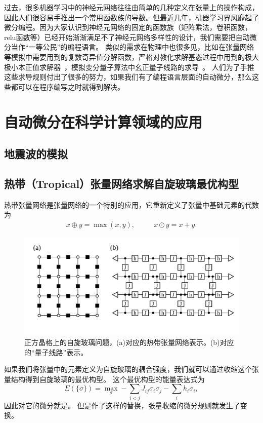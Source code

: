 \documentclass[A4,twoside,fontset=ubuntu,UTF8]{ctexart}
\begin{document}
过去，很多机器学习中的神经元网络往往由简单的几种定义在张量上的操作构成，因此人们很容易手推出一个常用函数族的导数。但最近几年，机器学习界风靡起了微分编程。因为大家认识到神经元网络的固定的函数族（矩阵乘法，卷积函数，relu函数等）已经开始渐渐满足不了神经元网络多样性的设计，我们需要把自动微分当作“一等公民”的编程语言。
类似的需求在物理中也很多见，比如在张量网络等模拟中需要用到的复数奇异值分解函数\cite{Wan2019,Liao2019}，严格对教化求解基态过程中用到的极大极小本正值求解器~\cite{Xie2020}，模拟变分量子算法中幺正量子线路的求导~\cite{Luo2019}。
人们为了手推这些求导规则付出了很多的努力，如果我们有了编程语言层面的自动微分，那么这些都可以在程序编写之时就得到解决。

\baselineskip
\section{自动微分在科学计算领域的应用}

\baselineskip
\subsection{地震波的模拟}

\baselineskip
\subsection{热带（Tropical）张量网络求解自旋玻璃最优构型}
热带张量网络是张量网络的一个特别的应用，它重新定义了张量中基础元素的代数为
\begin{eqnarray}
x \oplus y  = \max(x, y),\,\,\,\,\,\,\,\,\,\,\,\, \,\,\,\,
x \odot y   =  x + y. \label{eq:max-sum-alg}
\end{eqnarray}
\begin{figure}[t]
\centering
\includegraphics[width=\columnwidth]{./transform12.pdf}
    \caption{正方晶格上的自旋玻璃问题，(a)对应的热带张量网络表示。(b)对应的“量子线路”表示。\label{fig:performance}} 
\end{figure}
如果我们将张量中的元素定义为自旋玻璃的耦合强度，我们就可以通过收缩这个张量结构得到自旋玻璃的最优构型。
这个最优构型的能量表达式为
\begin{equation}
    E(\{\sigma\}) = \max\limits_{\sigma}-\sum_{i < j }J_{ij} \sigma_i \sigma_j  - \sum_i h_i \sigma_i,
\label{eq:spinglassopt}
\end{equation}
    因此对它的微分就是。
但是作了这样的替换，张量收缩的微分规则就发生了变换。
\end{document}
